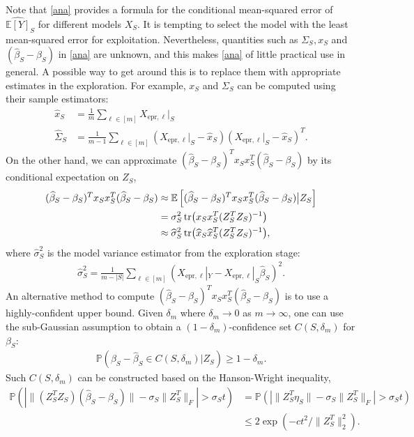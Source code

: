 \documentclass[11pt,a4paper]{amsart}
\numberwithin{equation}{section}
\theoremstyle{plain}
\theoremstyle{definition}
\def\E{{\mathbb E}}
\def\P{{\mathbb P}}
\def\ex{{\text{epr}}}
\begin{document}
Note that \eqref{ana} provides a formula for the conditional mean-squared error of $\widehat{\E[Y]}_S$ for different models $X_S$. 
It is tempting to select the model with the least mean-squared error for exploitation. 
Nevertheless, quantities such as $\Sigma_S, x_S$ and $(\widehat{\beta}_S-\beta_S)$ in \eqref{ana} are unknown, and this makes \eqref{ana} of little practical use in general. 
A possible way to get around this is to replace them with appropriate estimates in the exploration. 
For example, $x_S$ and $\Sigma_S$ can be computed using their sample estimators:
\begin{align}
\widehat{x}_S &= \frac{1}{m}\sum_{\ell\in [m]}X_{\ex, \ell}|_S\nonumber\\
\widehat{\Sigma}_S &= \frac{1}{m-1}\sum_{\ell\in [m]}(X_{\ex, \ell}|_S-\widehat{x}_S)(X_{\ex, \ell}|_S-\widehat{x}_S)^T.\label{e1}
\end{align} 
On the other hand, we can approximate $(\widehat{\beta}_S-\beta_S)^Tx_Sx_S^T(\widehat{\beta}_S-\beta_S)$ by its conditional expectation on $Z_S$, 
\begin{align}
(\widehat{\beta}_S-\beta_S)^Tx_Sx_S^T(\widehat{\beta}_S-\beta_S)&\approx \E\left[(\widehat{\beta}_S-\beta_S)^Tx_Sx_S^T(\widehat{\beta}_S-\beta_S)\big | Z_S\right]\nonumber\\
& = \sigma_S^2\tr(x_Sx_S^T(Z_S^TZ_S)^{-1})\nonumber\\
& \approx \widehat{\sigma}_S^2\tr(\widehat{x}_S\widehat{x}_S^T(Z_S^TZ_S)^{-1}),\label{sec}
\end{align}
where $\widehat{\sigma}^2_S$ is the model variance estimator from the exploration stage:
\begin{align}
\widehat{\sigma}^2_S = \frac{1}{m-|S|}\sum_{\ell\in [m]}\left(X_{\ex,\ell}|_Y -X_{\ex,\ell}|_S\widehat{\beta}_S \right)^2. 
\end{align}
An alternative method to compute $(\widehat{\beta}_S-\beta_S)^Tx_Sx_S^T(\widehat{\beta}_S-\beta_S)$ is to use a highly-confident upper bound. 
Given $\delta_m$ where $\delta_m\to 0$ as $m\to\infty$, one can use the sub-Gaussian assumption to obtain a $(1-\delta_m)$-confidence set $C(S,\delta_m)$ for $\beta_S$: 
\begin{align}
\P\left(\beta_S-\widehat{\beta}_S\in C(S,\delta_m) \big | Z_S\right)\geq 1-\delta_m.\label{e3}
\end{align}
Such $C(S,\delta_m)$ can be constructed based on the Hanson-Wright inequality,
\begin{align}
\P\left(\left|\|(Z_S^TZ_S)(\widehat{\beta}_S-\beta_S)\| -\sigma_S\|Z^T_S\|_F\right|>\sigma_St\right) &= \P\left(\left|\|Z^T_S\eta_S\| -\sigma_S\|Z^T_S\|_F\right|>\sigma_St\right)\nonumber\\
&\leq 2\exp(-ct^2/\|Z^T_S\|^2_2).\label{212}
\end{align}
\end{document}
